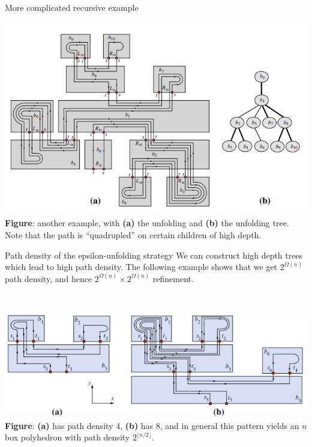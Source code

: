 \documentclass{beamer}
\theoremstyle{plain}
\begin{document}
  \begin{frame}{More complicated recursive example}
    \begin{center}
      \includegraphics[width=.9\textwidth]{./figs/Example_with_much_doubling.png}\\
      \tiny \textbf{Figure}: another example, with \textbf{(a)} the unfolding and \textbf{(b)} the unfolding tree. 
      Note that the path is ``quadrupled'' on certain children of high depth.
    \end{center}  
  \end{frame}

  \begin{frame}{Path density of the epsilon-unfolding strategy}
    We can construct high depth trees which lead to high path density.
    The following example shows that we get $2^{\Omega(n)}$ path density, and hence $2^{\Omega(n)} \times 2^{\Omega(n)}$ refinement.
    
    \;\\

    \begin{center}
      \includegraphics[width=\textwidth]{./figs/Exponential_path_density.png}\\
      \tiny \textbf{Figure}: \textbf{(a)} has path density 4, \textbf{(b)} has 8, and in general this pattern yields an $n$ box polyhedron with path density $2^{\lfloor n/2 \rfloor}$.
    \end{center}
  \end{frame}
\end{document}
